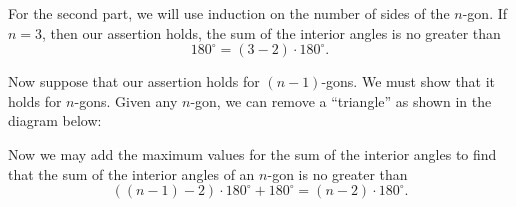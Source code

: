 \documentclass{ximera}
\begin{document}
\begin{question}
\begin{solution}
\begin{freeResponse}
For the second part, we will use induction on the number of sides of
the $n$-gon. If $n=3$, then our assertion holds, the sum of the interior angles is no greater than 
\[
180^\circ = (3-2) \cdot 180^\circ. 
\]

Now suppose that our assertion holds for $(n-1)$-gons. We must show
that it holds for $n$-gons. Given any $n$-gon, we can remove a
``triangle'' as shown in the diagram below:
\begin{image}
\end{image}
Now we may add the maximum values for the sum of the interior angles
to find that the sum of the interior angles of an $n$-gon is no
greater than
\[
((n-1)-2)\cdot 180^\circ + 180^\circ = (n-2)\cdot 180^\circ.
\]
\end{freeResponse}
\end{solution}
\end{question}
\end{document}
